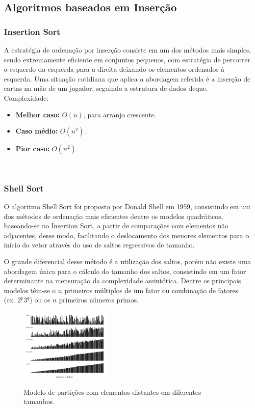 \documentclass[conference]{IEEEtran}
\begin{document}
\subsection{Algoritmos baseados em Inserção}

\subsubsection{Insertion Sort}
A estratégia de ordenação por inserção consiste em um dos métodos mais simples, sendo extremamente eficiente em conjuntos pequenos, com estratégia de percorrer o esquerdo da esquerda para a direita deixando os elementos ordenados  à esquerda. Uma situação cotidiana que aplica a abordagem referida é a inserção de cartas na mão de um jogador, seguindo a estrutura de dados deque.\\

Complexidade:
\begin{itemize}
\item \textbf{Melhor caso:} $O (n)$, para arranjo crescente.
\item \textbf{Caso médio:} $O (n^2)$.
\item \textbf{Pior caso:} $O (n^2)$.
\end{itemize}

~\\
\subsubsection{Shell Sort}

O algoritmo Shell Sort foi proposto por Donald Shell em 1959, consistindo em um dos métodos de ordenação mais eficientes dentre os modelos quadráticos, baseando-se no Insertion Sort, a partir de comparações com elementos não adjacentes, desse modo, facilitando o deslocamento dos menores elementos para o início do vetor através do uso de saltos regressivos de tamanho.

O grande diferencial desse método é a utilização dos saltos, porém não existe uma abordagem única para o cálculo do tamanho dos saltos, consistindo em um fator determinante na mensuração da complexidade assintótica. Dentre os principais modelos têm-se o $n$ primeiros múltiplos de um fator ou combinação de fatores (ex. $2^p3^q$) ou os $n$ primeiros números primos.

\begin{figure}
  \caption{Modelo de partições com elementos distantes em diferentes tamanhos.}
  \centering
    \includegraphics[width=0.4\textwidth]{images/shell.jpg}
    \label{image:shell}
\end{figure}
\end{document}

